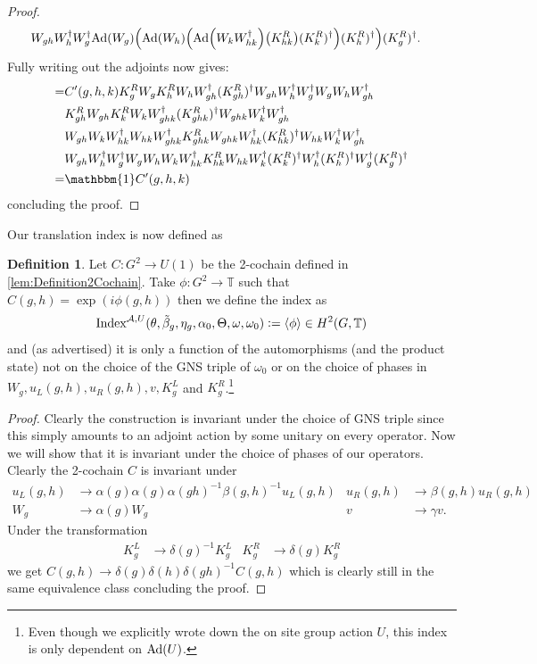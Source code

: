 \documentclass[12pt,a4paper,twoside]{article}
\newcommand{\defeq}{\vcentcolon=}
\let\originalleft\left
\let\originalright\right
\renewcommand{\left}{\mathopen{}\mathclose\bgroup\originalleft}
\renewcommand{\right}{\aftergroup\egroup\originalright}
\newcommand{\TT}{\mathbb T}
\renewcommand{\AA}{\mathcal A}
\newcommand{\id}{\mathbbm{1}}
\newcommand{\Ad}[1]{\textrm{Ad}\left(#1\right)}
\theoremstyle{definition}
\newtheorem{definition}[theorem]{Definition}
\numberwithin{equation}{section}
\begin{document}
\begin{proof}
\begin{align}
		\nonumber
		&W_{gh}W_h^\dagger W_g^\dagger\Ad{W_g}\left(\Ad{W_h}\left(\Ad{W_kW_{hk}^\dagger}\left(K_{hk}^R\right)(K^R_k)^\dagger\right)(K^R_h)^\dagger\right)(K^R_g)^\dagger.
	\end{align}
	Fully writing out the adjoints now gives:
	\begin{align}
	=&C'(g,h,k)K_g^RW_gK_h^RW_hW_{gh}^\dagger (K_{gh}^R)^\dagger W_{gh}W_h^\dagger W_g^\dagger W_gW_hW_{gh}^\dagger \\
	\nonumber
	&K_{gh}^RW_{gh}K_k^RW_kW_{ghk}^\dagger(K_{ghk}^R)^\dagger W_{ghk}W_k^\dagger W_{gh}^\dagger  \\
	\nonumber
	&W_{gh}W_kW_{hk}^\dagger W_{hk}W_{ghk}^\dagger K^R_{ghk} W_{ghk}W_{hk}^\dagger(K^R_{hk})^{\dagger} W_{hk}W_k^\dagger W_{gh}^\dagger\\
	\nonumber
	&W_{gh}W_h^\dagger W_g^\dagger W_gW_h W_kW_{hk}^\dagger K_{hk}^RW_{hk}W_k^\dagger(K^R_k)^\dagger W_h^\dagger (K^R_h)^\dagger W_g^\dagger (K^R_g)^\dagger\\
	=&\id C'(g,h,k)
	\end{align}
	concluding the proof.
\end{proof}
Our translation index is now defined as
\begin{definition}
	Let $C:G^2\rightarrow U(1)$ be the 2-cochain defined in \ref{lem:Definition2Cochain}. Take $\phi:G^2\rightarrow\TT$ such that $C(g,h)=\exp(i\phi(g,h))$ then we define the index as
	\begin{equation}
	\textrm{Index}^{\AA,U}(\theta,\tilde{\beta}_g,\eta_g,\alpha_0,\Theta,\omega,\omega_0)\defeq\expval{\phi}\in H^2(G,\TT)
	\end{equation}
	and (as advertised) it is only a function of the automorphisms (and the product state) not on the choice of the GNS triple of $\omega_0$ or on the choice of phases in $W_g,u_L(g,h),u_R(g,h),v,K_g^L$ and $K_g^R$.\footnote{Even though we explicitly wrote down the on site group action $U$, this index is only dependent on $\Ad{U}$.}
\end{definition}
\begin{proof}
	Clearly the construction is invariant under the choice of GNS triple since this simply amounts to an adjoint action by some unitary on every operator. Now we will show that it is invariant under the choice of phases of our operators. Clearly the 2-cochain $C$ is invariant under
	\begin{align}
		u_L(g,h)&\rightarrow \alpha(g)\alpha(g)\alpha(gh)^{-1}\beta(g,h)^{-1} u_L(g,h)&u_R(g,h)&\rightarrow \beta(g,h)u_R(g,h)\\
		W_g&\rightarrow\alpha(g)W_g&v&\rightarrow \gamma v.
	\end{align}
	Under the transformation
	\begin{align}
		K_g^L&\rightarrow \delta(g)^{-1}K_g^L&K_g^R&\rightarrow \delta(g)K_g^R
	\end{align}
	we get $C(g,h)\rightarrow \delta(g)\delta(h)\delta(gh)^{-1}C(g,h)$ which is clearly still in the same equivalence class concluding the proof.
\end{proof}
\end{document}
